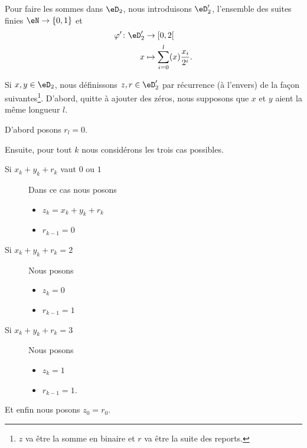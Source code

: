 Pour faire les sommes dans \( \eD_2\), nous introduisons \( \eD_2'\), l'ensemble des suites finies \( \eN\to \{ 0,1 \}\) et
\begin{equation}
	\begin{aligned}
		\varphi'\colon \eD'_2 & \to \mathopen[ 0,2\mathclose[               \\
		x                     & \mapsto \sum_{i=0}^l(x)\frac{ x_i }{ 2^i }.
	\end{aligned}
\end{equation}

\begin{definition}	\label{DEFooRJSFooDvbkrx}
	Si \( x,y\in \eD_2\), nous définissons \( z,r\in \eD_2'\) par récurrence (à l'envers) de la façon suivantes\footnote{\( z\) va être la somme en binaire et \( r\) va être la suite des reports.}. D'abord, quitte à ajouter des zéros, nous supposons que \( x\) et \( y\) aient la même longueur \( l\).

	D'abord posons \( r_l=0\).

	Ensuite, pour tout \( k\) nous considérons les trois cas possibles.
	\begin{description}
		\item[Si \( x_k+y_k+r_k\) vaut \( 0\) ou \( 1\)]
		      Dans ce cas nous posons
		      \begin{itemize}
			      \item
			            \( z_k=x_k+y_k+r_k\)
			      \item
			            \( r_{k-1}=0\)
		      \end{itemize}
		\item[Si \( x_k+y_k+r_k=2\)]
		      Nous posons
		      \begin{itemize}
			      \item
			            \( z_k=0\)
			      \item
			            \( r_{k-1}=1\)
		      \end{itemize}
		\item[Si \( x_k+y_k+r_k=3\)]
		      Nous posons
		      \begin{itemize}
			      \item
			            \( z_k=1\)
			      \item
			            \( r_{k-1}=1\).
		      \end{itemize}
	\end{description}
	Et enfin nous posons \( z_0=r_0\).
\end{definition}

